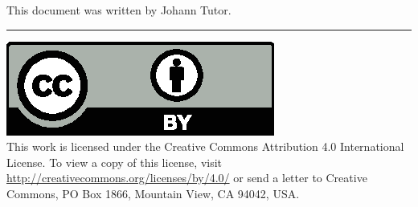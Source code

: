 \documentclass{article}
\begin{document}
This document was written by Johann Tutor.

\medskip
\hrule

{
  \small
  \includegraphics[scale=0.5]{cc-by.eps}\\
  This work is licensed under the Creative Commons Attribution 4.0
  International License. To view a copy of this license, visit
  \url{http://creativecommons.org/licenses/by/4.0/} or send a letter to Creative Commons, PO Box 1866, Mountain View, CA 94042, USA.
}
\end{document}
